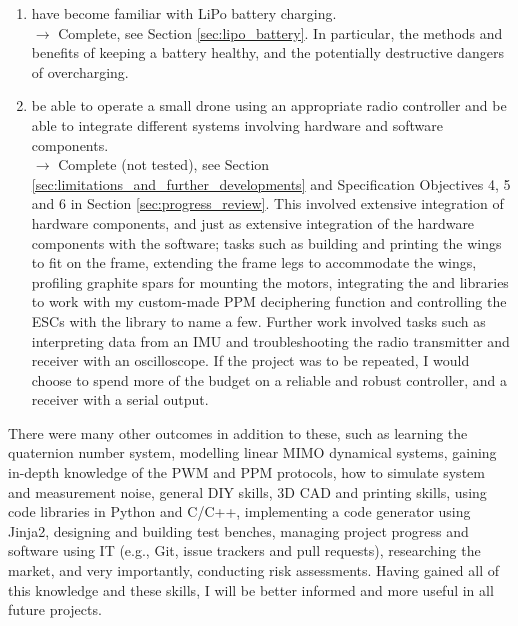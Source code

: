 \begin{enumerate}
    \item have become familiar with LiPo battery charging. \\$\rightarrow$ \textcolor{green!60!black}{Complete}, see Section \ref{sec:lipo_battery}. In particular, the methods and benefits of keeping a battery healthy, and the potentially destructive dangers of overcharging.
    \item be able to operate a small drone using an appropriate radio controller and be able to integrate different systems involving hardware and software components. \\
    $\rightarrow${} 
    \textcolor{green!60!black}{Complete (not tested)}, see Section \ref{sec:limitations_and_further_developments} and Specification Objectives 4, 5 and 6 in Section \ref{sec:progress_review}. This involved extensive integration of hardware components, and just as extensive integration of the hardware components with the software; tasks such as building and printing the wings to fit on the frame, extending the frame legs to accommodate the wings, profiling graphite spars for mounting the motors, integrating the  and  libraries to work with my custom-made PPM deciphering function and controlling the ESCs with the  library to name a few. Further work involved tasks such as interpreting data from an IMU and troubleshooting the radio transmitter and receiver with an oscilloscope. If the project was to be repeated, I would choose to spend more of the budget on a reliable and robust controller, and a receiver with a serial output.
\end{enumerate}
There were many other outcomes in addition to these, such as learning the quaternion number system, modelling linear \ac{MIMO} dynamical systems, gaining in-depth knowledge of the \ac{PWM} and \ac{PPM} protocols, how to simulate system and measurement noise, general DIY skills, 3D \ac{CAD} and printing skills, using code libraries in Python and C/C++, implementing a code generator using Jinja2, designing and building test benches, managing project progress and software using IT (e.g., Git, issue trackers and pull requests), researching the market, and very importantly, conducting risk assessments. Having gained all of this knowledge and these skills, I will be better informed and more useful in all future projects.








